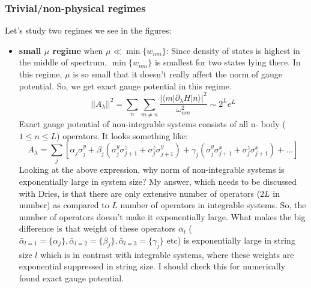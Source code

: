 \documentclass[11pt,a4paper]{article}
\begin{document}
\subsubsection*{Trivial/non-physical regimes}
 Let's study two regimes we see in the figures: 
\begin{itemize}
\item \textbf{small $\mu$ regime} when $\mu \ll \min\{w_{nm}\}$: Since density of states is highest in the middle of spectrum, $\min\{w_{nm}\}$ is smallest for two states lying there.  In this regime, $\mu$ is so small that it doesn't really affect the norm of gauge potential. So, we get exact gauge potential in this regime.
\begin{equation}
||A_{\lambda}||^2 = \sum_n \sum_{m \neq n}  \dfrac{|\langle m | \partial_{\lambda}H| n \rangle|^2}{\omega_{nm}^2}  \sim 2^Le^L
\end{equation}
Exact gauge potential of non-integrable systems consists of all n- body ($1 \leq n \leq L$) operators. It looks something like:
\begin{equation}
A_{\lambda} = \sum_j [\alpha_j \sigma_j^y + \beta_j ( \sigma_j^y  \sigma_{j+1}^z + \sigma_j^z  \sigma_{j+1}^y ) + \gamma_j ( \sigma_j^y  \sigma_{j+1}^x + \sigma_j^z  \sigma_{j+1}^x ) + \ldots]
\end{equation} 
Looking at the above expression, why norm  of non-integrable systems is exponentially large in system size? My answer, which needs to be discussed with Dries, is that there are only extensive number of operators ($2 L$ in number) as compared to $L$ number of operators in integrable systems. So, the number of operators doesn't make it exponentially large. What makes the big difference is that weight of these operators $\bar{\alpha}_l$ ($ \bar{\alpha}_{l=1}= \{\alpha_j\}, \bar{\alpha}_{l=2}= \{\beta_j\}, \bar{\alpha}_{l=3}=  \{\gamma_j\}$ etc) is exponentially large in string size $l$ which is in contrast with integrable systems, where these weights are exponential suppressed in string size. I should check this for numerically found exact gauge potential.


\end{itemize}
\end{document}
